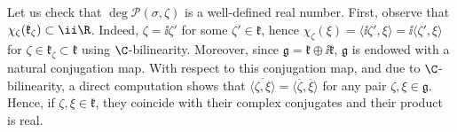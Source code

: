 \begin{obs} \label{obs_deg_well_defined}
    Let us check that \(\deg \mathcal{P}(\sigma, \zeta)\) is a well-defined real number. First, observe that \(\chi_\zeta(\mathfrak{k}_\zeta) \subset \ii \R\). Indeed, \(\zeta=\ii \zeta'\) for some \(\zeta' \in \mathfrak{k}\), hence \(\chi_\zeta(\xi)=\langle \ii \zeta', \xi \rangle = \ii \langle \zeta', \xi \rangle\) for \(\zeta \in \mathfrak{k}_\zeta \subset \mathfrak{k}\) using \(\C\)-bilinearity. Moreover, since \(\mathfrak{g}=\mathfrak{k}\oplus \ii \mathfrak{k}\), \(\mathfrak{g}\) is endowed with a natural conjugation map. With respect to this conjugation map, and due to \(\C\)-bilinearity, a direct computation shows that \(\overline{\langle \zeta, \xi \rangle} = \langle \overline{\zeta}, \overline{\xi} \rangle\) for any pair \(\zeta, \xi \in \mathfrak{g}\). Hence, if \(\zeta, \xi \in \mathfrak{k}\), they coincide with their complex conjugates and their product is real. 


\end{obs}
